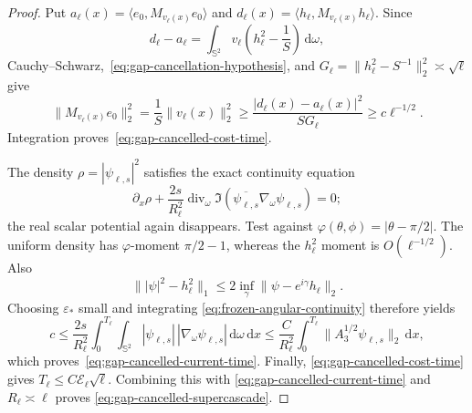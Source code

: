 \documentclass[11pt]{article}
\newcommand{\dd}{\,\mathrm d}
\theoremstyle{definition}
\theoremstyle{remark}
\begin{document}
\begin{proof}
Put $a_\ell(x)=\langle e_0,M_{v_\ell(x)}e_0\rangle$ and
$d_\ell(x)=\langle h_\ell,M_{v_\ell(x)}h_\ell\rangle$.  Since
\begin{equation}
 d_\ell-a_\ell
 =\int_{\mathbb S^2}v_\ell
 \left(h_\ell^2-\frac1S\right)\dd\omega,
\end{equation}
Cauchy--Schwarz,~\eqref{eq:gap-cancellation-hypothesis}, and
$G_\ell=\|h_\ell^2-S^{-1}\|_2^2\asymp\sqrt\ell$ give
\begin{equation}
 \|M_{v_\ell(x)}e_0\|_2^2
 =\frac1S\|v_\ell(x)\|_2^2
 \geq\frac{|d_\ell(x)-a_\ell(x)|^2}{SG_\ell}
 \geq c\ell^{-1/2}.
 \label{eq:gap-cancelled-pointwise-cost}
\end{equation}
Integration proves~\eqref{eq:gap-cancelled-cost-time}.

The density $\rho=|\psi_{\ell,s}|^2$ satisfies the exact continuity equation
\begin{equation}
 \partial_x\rho
 +\frac{2s}{R_\ell^2}
 \operatorname{div}_\omega
 \Im(\overline{\psi_{\ell,s}}\nabla_\omega\psi_{\ell,s})=0;
 \label{eq:frozen-angular-continuity}
\end{equation}
the real scalar potential again disappears.  Test against
$\varphi(\theta,\phi)=|\theta-\pi/2|$.  The uniform density has
$\varphi$-moment $\pi/2-1$, whereas the $h_\ell^2$ moment is
$O(\ell^{-1/2})$.  Also
\begin{equation}
 \bigl\||\psi|^2-h_\ell^2\bigr\|_1
 \leq2\inf_\gamma\|\psi-e^{i\gamma}h_\ell\|_2.
\end{equation}
Choosing $\varepsilon_*$ small and integrating
\eqref{eq:frozen-angular-continuity} therefore yields
\begin{equation}
 c\leq\frac{2s}{R_\ell^2}
 \int_0^{T_\ell}\int_{\mathbb S^2}
 |\psi_{\ell,s}|\,|\nabla_\omega\psi_{\ell,s}|\dd\omega\dd x
 \leq\frac{C}{R_\ell^2}
 \int_0^{T_\ell}\|A_3^{1/2}\psi_{\ell,s}\|_2\dd x,
\end{equation}
which proves~\eqref{eq:gap-cancelled-current-time}.  Finally,
\eqref{eq:gap-cancelled-cost-time} gives
$T_\ell\leq C\mathcal E_\ell\sqrt\ell$.  Combining this with
\eqref{eq:gap-cancelled-current-time} and $R_\ell\asymp\ell$ proves
\eqref{eq:gap-cancelled-supercascade}.
\end{proof}
\end{document}
